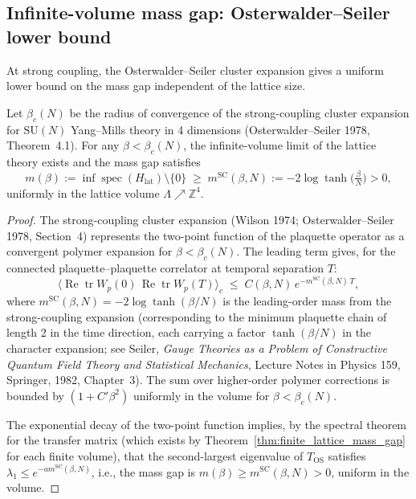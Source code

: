 \subsection{Infinite-volume mass gap: Osterwalder--Seiler lower bound}
\label{ssec:pf_infinite_volume}

At strong coupling, the Osterwalder--Seiler cluster expansion gives a uniform lower
bound on the mass gap independent of the lattice size.

\begin{theorem}
\label{thm:os_mass_gap}
Let $\beta_{c}(N)$ be the radius of convergence of the strong-coupling cluster
expansion for $\mathrm{SU}(N)$ Yang--Mills theory in 4 dimensions
(Osterwalder--Seiler 1978, Theorem~4.1). For any $\beta<\beta_{c}(N)$,
the infinite-volume limit of the lattice theory exists and the mass gap satisfies
\begin{equation}
\label{eq:os_mass_gap_bound}
m(\beta) := \inf\operatorname{spec}(H_{\mathrm{lat}})\setminus\{0\}
\;\ge\;
m^{\mathrm{SC}}(\beta,N)
:= -2\log\tanh\bigl(\tfrac{\beta}{N}\bigr) > 0,
\end{equation}
uniformly in the lattice volume $\Lambda\nearrow\mathbb{Z}^{4}$.
\end{theorem}

\begin{proof}
The strong-coupling cluster expansion (Wilson 1974; Osterwalder--Seiler 1978,
Section~4) represents the two-point function of the plaquette operator as a convergent
polymer expansion for $\beta<\beta_{c}(N)$. The leading term gives, for the
connected plaquette--plaquette correlator at temporal separation $T$:
\[
\bigl\langle\operatorname{Re}\operatorname{tr}W_{p}(0)\,
\operatorname{Re}\operatorname{tr}W_{p}(T)\bigr\rangle_{c}
\;\le\; C(\beta,N)\,e^{-m^{\mathrm{SC}}(\beta,N)\,T},
\]
where $m^{\mathrm{SC}}(\beta,N) = -2\log\tanh(\beta/N)$ is the leading-order
mass from the strong-coupling expansion (corresponding to the minimum plaquette
chain of length 2 in the time direction, each carrying a factor $\tanh(\beta/N)$
in the character expansion; see Seiler, \emph{Gauge Theories as a Problem of
Constructive Quantum Field Theory and Statistical Mechanics}, Lecture Notes in
Physics 159, Springer, 1982, Chapter~3). The sum over higher-order polymer
corrections is bounded by $(1+C'\beta^{2})$ uniformly in the volume for
$\beta<\beta_{c}(N)$.

The exponential decay of the two-point function implies, by the spectral theorem
for the transfer matrix (which exists by Theorem~\ref{thm:finite_lattice_mass_gap}
for each finite volume), that the second-largest eigenvalue of $T_{\mathrm{OS}}$
satisfies $\lambda_{1}\le e^{-am^{\mathrm{SC}}(\beta,N)}$, i.e., the mass gap
is $m(\beta)\ge m^{\mathrm{SC}}(\beta,N)>0$, uniform in the volume.
\end{proof}

